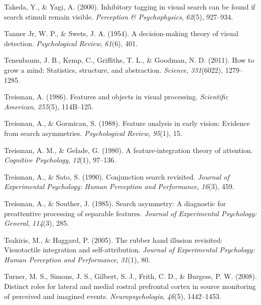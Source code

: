 \documentclass[12pt,twoside]{reedthesis}
\begin{document}
\leavevmode\hypertarget{ref-takeda2000inhibitory}{}%
Takeda, Y., \& Yagi, A. (2000). Inhibitory tagging in visual search can be found if search stimuli remain visible. \emph{Perception \& Psychophysics}, \emph{62}(5), 927--934.

\leavevmode\hypertarget{ref-tanner1954decision}{}%
Tanner Jr, W. P., \& Swets, J. A. (1954). A decision-making theory of visual detection. \emph{Psychological Review}, \emph{61}(6), 401.

\leavevmode\hypertarget{ref-tenenbaum2011grow}{}%
Tenenbaum, J. B., Kemp, C., Griffiths, T. L., \& Goodman, N. D. (2011). How to grow a mind: Statistics, structure, and abstraction. \emph{Science}, \emph{331}(6022), 1279--1285.

\leavevmode\hypertarget{ref-treisman1986features}{}%
Treisman, A. (1986). Features and objects in visual processing. \emph{Scientific American}, \emph{255}(5), 114B--125.

\leavevmode\hypertarget{ref-treisman1988feature}{}%
Treisman, A., \& Gormican, S. (1988). Feature analysis in early vision: Evidence from search asymmetries. \emph{Psychological Review}, \emph{95}(1), 15.

\leavevmode\hypertarget{ref-treisman1980feature}{}%
Treisman, A. M., \& Gelade, G. (1980). A feature-integration theory of attention. \emph{Cognitive Psychology}, \emph{12}(1), 97--136.

\leavevmode\hypertarget{ref-treisman1990conjunction}{}%
Treisman, A., \& Sato, S. (1990). Conjunction search revisited. \emph{Journal of Experimental Psychology: Human Perception and Performance}, \emph{16}(3), 459.

\leavevmode\hypertarget{ref-treisman1985search}{}%
Treisman, A., \& Souther, J. (1985). Search asymmetry: A diagnostic for preattentive processing of separable features. \emph{Journal of Experimental Psychology: General}, \emph{114}(3), 285.

\leavevmode\hypertarget{ref-tsakiris2005rubber}{}%
Tsakiris, M., \& Haggard, P. (2005). The rubber hand illusion revisited: Visuotactile integration and self-attribution. \emph{Journal of Experimental Psychology: Human Perception and Performance}, \emph{31}(1), 80.

\leavevmode\hypertarget{ref-turner2008distinct}{}%
Turner, M. S., Simons, J. S., Gilbert, S. J., Frith, C. D., \& Burgess, P. W. (2008). Distinct roles for lateral and medial rostral prefrontal cortex in source monitoring of perceived and imagined events. \emph{Neuropsychologia}, \emph{46}(5), 1442--1453.
\end{document}
